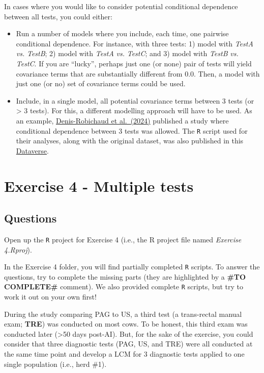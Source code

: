 \documentclass[
]{book}
\begin{document}
In cases where you would like to consider potential conditional dependence between all tests, you could either:

\begin{itemize}
\item
  Run a number of models where you include, each time, one pairwise conditional dependence. For instance, with three tests: 1) model with \emph{TestA} \emph{vs.} \emph{TestB}; 2) model with \emph{TestA} \emph{vs.} \emph{TestC}; and 3) model with \emph{TestB} \emph{vs.} \emph{TestC}. If you are ``lucky'', perhaps just one (or none) pair of tests will yield covariance terms that are substantially different from 0.0. Then, a model with just one (or no) set of covariance terms could be used.
\item
  Include, in a single model, all potential covariance terms between 3 tests (or \textgreater{} 3 tests). For this, a different modelling approach will have to be used. As an example, \href{https://doi.org/10.3168/jds.2024-24693}{Denis-Robichaud et al.~(2024)} published a study where conditional dependence between 3 tests was allowed. The \texttt{R} script used for their analyses, along with the original dataset, was also published in this \href{https://doi.org/10.7910/DVN/EATTYD}{Dataverse}.
\end{itemize}

\chapter{Exercise 4 - Multiple tests}\label{exercise-4---multiple-tests}

\section{Questions}\label{questions-3}

Open up the \texttt{R} project for Exercise 4 (i.e., the R project file named \emph{Exercise 4.Rproj}).

In the Exercise 4 folder, you will find partially completed \texttt{R} scripts. To answer the questions, try to complete the missing parts (they are highlighted by a \textbf{\#TO COMPLETE\#} comment). We also provided complete \texttt{R} scripts, but try to work it out on your own first!

During the study comparing PAG to US, a third test (a trans-rectal manual exam; \textbf{TRE}) was conducted on most cows. To be honest, this third exam was conducted later (\textgreater50 days post-AI). But, for the sake of the exercise, you could consider that three diagnostic tests (PAG, US, and TRE) were all conducted at the same time point and develop a LCM for 3 diagnostic tests applied to one single population (i.e., herd \#1).
\end{document}
